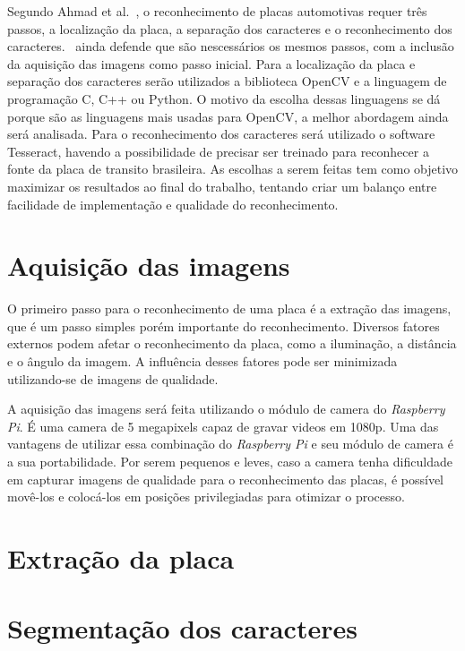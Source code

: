 Segundo Ahmad et al.~\cite{ahmad2015automatic}, o reconhecimento de placas
automotivas requer três passos, a localização da placa, a separação dos
caracteres e o reconhecimento dos caracteres.~\cite{s2013automatic} ainda defende que são nescessários 
os mesmos passos, com a inclusão da aquisição das imagens como passo inicial. Para a localização da placa e
separação dos caracteres serão utilizados a biblioteca OpenCV e a linguagem de
programação C, C++ ou Python. O motivo da escolha dessas linguagens se dá porque
são as linguagens mais usadas para OpenCV, a melhor abordagem ainda será
analisada. Para o reconhecimento dos caracteres será utilizado o software Tesseract, havendo a possibilidade 
de precisar ser treinado para reconhecer a fonte da placa de transito brasileira. As escolhas a serem
feitas tem como objetivo maximizar os resultados ao final do trabalho, tentando
criar um balanço entre facilidade de implementação e qualidade do
reconhecimento.

\section{Aquisição das imagens}
\label{sec:aquisicao}

O primeiro passo para o reconhecimento de uma placa é a extração das imagens, que é um passo simples 
porém importante do reconhecimento. Diversos fatores externos podem afetar o reconhecimento da placa, 
como a iluminação, a distância e o ângulo da imagem. A influência desses fatores pode ser minimizada 
utilizando-se de imagens de qualidade.

A aquisição das imagens será feita utilizando o módulo de camera do \emph{Raspberry Pi}. É uma camera de 
5 megapixels capaz de gravar videos em 1080p. Uma das vantagens de utilizar essa combinação do \emph{Raspberry Pi} 
e seu módulo de camera é a sua portabilidade. Por serem pequenos e leves, caso a camera tenha dificuldade em 
capturar imagens de qualidade para o reconhecimento das placas, é possível movê-los e colocá-los em posições 
privilegiadas para otimizar o processo.

\section{Extração da placa}
\label{sec:extracao}

\section{Segmentação dos caracteres}
\label{sec:segmentacao}

